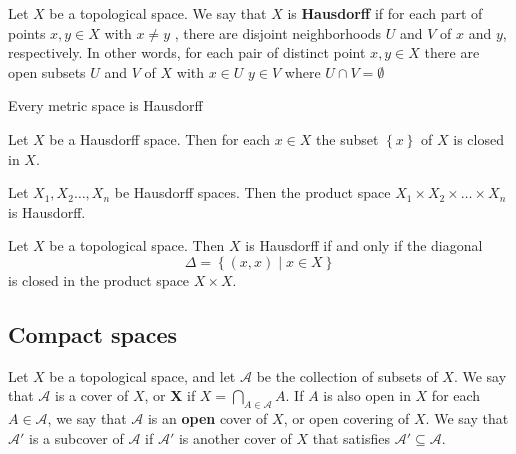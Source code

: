 \documentclass{article}
\theoremstyle{remark}
\begin{document}
\begin{definition}[Hausdorff]

    Let $X $ be a topological space. We say that $X$ is \textbf{Hausdorff} if for each part of points $x,y  \in X $ with
    $x\neq y$ , there are disjoint neighborhoods $U$ and $V$ of $x$ and $y$, respectively. In other words, for each pair
    of distinct point $x,y \in  X$ there are open subsets $U$ and $V$ of $X$ with $x \in U$ $y \in V $ where $U \cap V =
    \emptyset $
\end{definition}

\begin{theorem}
    Every metric space is Hausdorff

\end{theorem}

\begin{theorem}
    Let $X$ be a Hausdorff space. Then for each $x \in X$ the subset $\left\{ x  \right\}$ of $X$ is closed in  $X$.
\end{theorem}


\begin{theorem}
    Let $X_{1}, X_{2} \ldots, X_{n} $ be Hausdorff spaces.  Then the product space $X_{1} \times  X_{2}\times  \ldots
    \times X_{n}  $ is Hausdorff.

\end{theorem}


\begin{theorem}
Let $X$ be a topological space.  Then $X$ is Hausdorff if and only if the diagonal \[
    \Delta = \left\{ \left( x,x \right)  \mid  x \in  X \right\}
\]is closed in the product space $X \times  X$.
\end{theorem}

\subsection{Compact spaces}%
\label{sub:compace_spaces}

\begin{definition}
    Let $X$ be a topological space, and let $\mathscr{A} $ be the collection of subsets of $X$. We say that  $
    \mathscr{A} $ is a cover of $X$, or  \textbf{X} if $X = \bigcap_{A \in \mathscr{A} }^{} A$. If $A$ is also open in
     $X$ for each  $A \in  \mathscr{A} $, we say that $\mathscr{A} $ is an \textbf{open} cover of $X$, or open
     covering of $X$. We say that $ \mathscr{A}' $ is a subcover of $\mathscr{A} $ if $\mathscr{A} '  $ is another
     cover of $X$ that satisfies  $ \mathscr{A '} \subseteq \mathscr{A}  $.
\end{definition}
\end{document}
